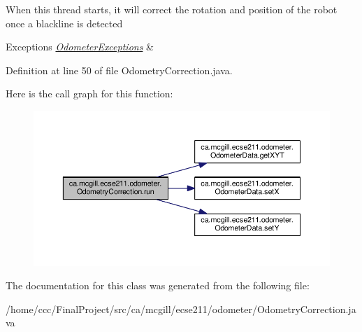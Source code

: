 When this thread starts, it will correct the rotation and position of the robot once a blackline is detected


\begin{DoxyExceptions}{Exceptions}
{\em \hyperlink{classca_1_1mcgill_1_1ecse211_1_1odometer_1_1_odometer_exceptions}{Odometer\+Exceptions}} & \\
\hline
\end{DoxyExceptions}


Definition at line 50 of file Odometry\+Correction.\+java.

Here is the call graph for this function\+:
\nopagebreak
\begin{figure}[H]
\begin{center}
\leavevmode
\includegraphics[width=350pt]{classca_1_1mcgill_1_1ecse211_1_1odometer_1_1_odometry_correction_aad66a7030ac00f3a9cbe7bc33c25acbf_cgraph}
\end{center}
\end{figure}


The documentation for this class was generated from the following file\+:\begin{DoxyCompactItemize}
\item 
/home/ccc/\+Final\+Project/src/ca/mcgill/ecse211/odometer/Odometry\+Correction.\+java\end{DoxyCompactItemize}
